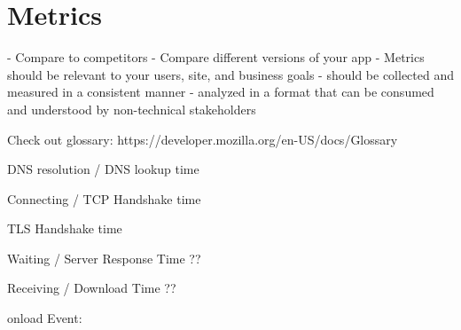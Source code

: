 \section{Metrics}















- Compare to competitors
- Compare different versions of your app
- Metrics should be relevant to your users, site, and business goals
- should be collected and measured in a consistent manner
- analyzed in a format that can be consumed and understood by non-technical stakeholders





Check out glossary: https://developer.mozilla.org/en-US/docs/Glossary



DNS resolution / DNS lookup time %


Connecting / TCP Handshake time %


TLS Handshake time %


Waiting / Server Response Time ?? %


Receiving / Download Time ?? %




onload Event: %




